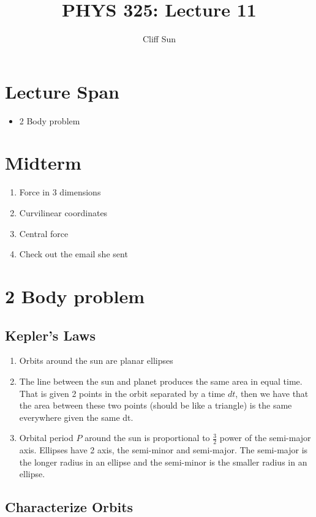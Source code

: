 \documentclass{article}
\title{PHYS 325: Lecture 11}
\author{Cliff Sun}
\newtheorem{one minute paper}[theorem]{One Minute Paper}
\begin{document}
\maketitle

\section*{Lecture Span}
\begin{itemize}
    \item 2 Body problem
\end{itemize}

\section*{Midterm}
\begin{enumerate}
    \item Force in 3 dimensions
    \item Curvilinear coordinates
    \item Central force
    \item Check out the email she sent
\end{enumerate}

\section*{2 Body problem}

\subsection*{Kepler's Laws}
\begin{enumerate}
    \item Orbits around the sun are planar ellipses
    \item The line between the sun and planet produces the same area in equal time. That is given 2 points in the orbit separated by a time $dt$, then we have that
    the area between these two points (should be like a triangle) is the same everywhere given the same dt. 
    \item Orbital period $P$ around the sun is proportional to $\frac{3}{2}$ power of the semi-major axis. Ellipses have 2 axis, the semi-minor and semi-major. The semi-major is the longer radius in 
    an ellipse and the semi-minor is the smaller radius in an ellipse.  
\end{enumerate}

\subsection*{Characterize Orbits}
\end{document}
